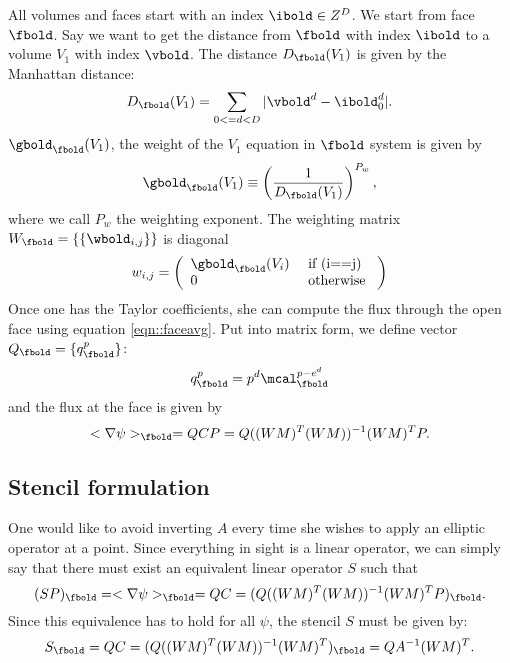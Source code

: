 \documentclass{article}
\begin{document}
{All volumes and faces  start with an  index $\ibold \in Z^D$.
We start from face $\fbold$.   Say we want to get
the distance from $\fbold$ with index $\ibold$ to a volume $V_1$
with index $\vbold$.  The distance $D_\fbold(V_1)$ is given by
the Manhattan distance:
\begin{equation}
  D_\fbold(V_1) = \sum\limits_{0 <= d < D} |\vbold^d - \ibold_0^d|.
\label{eqn::uptownFunk}
\end{equation}
$\gbold_\fbold(V_1)$, the weight of the $V_1$ equation in $\fbold$ system
is given by
\begin{equation}
  \gbold_\fbold(V_1)  \equiv \left(\frac{1}{D_\fbold(V_1) } \right)^{P_w},
\label{eqn::weightFunk}  
\end{equation}
where we call $P_w$ the weighting exponent.
The weighting matrix $W_\fbold = \{\{\wbold_{i,j}\}\}$ is diagonal
\begin{equation}
w_{i,j} =
\left(
\begin{array}{ll}
 \gbold_\fbold(V_i) & \mbox{ if } $(i==j)$ \\
 0   & \mbox{ otherwise }
\end{array}
\right)
\end{equation}
Once one has the Taylor coefficients, she can compute the flux through
the open face using  equation \ref{eqn::faceavg}.   Put into matrix
form, we define  vector  $Q_\fbold = \{q^p_\fbold\}$:
\begin{equation}
q^p_\fbold = p^d \mcal^{p-e^d}_\fbold
\end{equation}
and the flux at the face is given by
\begin{equation}
<\nabla \psi>_\fbold = Q C P= Q ((WM)^T(WM))^{-1} (WM)^T  P.
\end{equation}

\subsection{Stencil formulation}
One would like to avoid inverting $A$ every time she wishes to apply
an elliptic operator at a point.  Since everything in sight is a
linear operator, we can simply say that there must exist an equivalent
linear operator $S$ such that
\begin{equation}
(S P)_\fbold = <\nabla \psi>_\fbold = Q C= (Q ((WM)^T(WM))^{-1} (WM)^T  P)_\fbold.
\end{equation}
Since this equivalence has to hold for all $\psi$, the stencil $S$ must be
given by:
\begin{equation}
 S_\fbold = Q C = (Q ((WM)^T(WM))^{-1} (WM)^T  )_\fbold = Q A^{-1} (WM)^T.
\end{equation}

}
\end{document}

